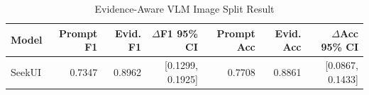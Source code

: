 \begin{table}[t]
\centering
\small
\begin{tabular}{lrrrrrr}
\toprule
Model & Prompt F1 & Evid. F1 & $\Delta$F1 95\% CI & Prompt Acc & Evid. Acc & $\Delta$Acc 95\% CI \\
\midrule
SeekUI & 0.7347 & 0.8962 & [0.1299, 0.1925] & 0.7708 & 0.8861 & [0.0867, 0.1433] \\
\bottomrule
\end{tabular}
\caption{Evidence-Aware VLM Image Split Result}
\label{tab:evidence_heldout_image_split}
\end{table}
